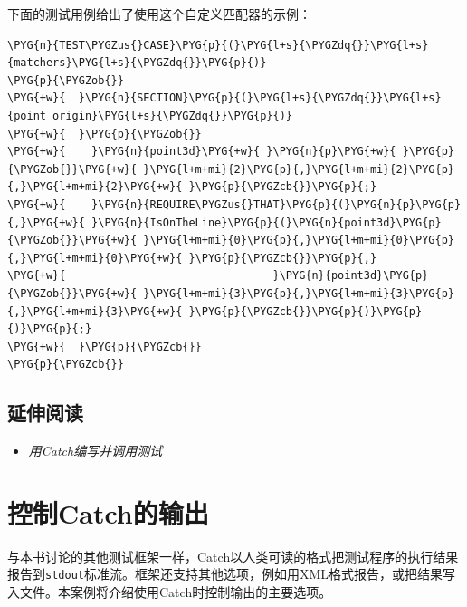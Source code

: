 
下面的测试用例给出了使用这个自定义匹配器的示例：



\begin{codeblockbg}
\begin{Verbatim}[commandchars=\\\{\},breaklines=true,breakanywhere=true,fontsize=\codefont,xleftmargin=17bp]
\PYG{n}{TEST\PYGZus{}CASE}\PYG{p}{(}\PYG{l+s}{\PYGZdq{}}\PYG{l+s}{matchers}\PYG{l+s}{\PYGZdq{}}\PYG{p}{)}
\PYG{p}{\PYGZob{}}
\PYG{+w}{  }\PYG{n}{SECTION}\PYG{p}{(}\PYG{l+s}{\PYGZdq{}}\PYG{l+s}{point origin}\PYG{l+s}{\PYGZdq{}}\PYG{p}{)}
\PYG{+w}{  }\PYG{p}{\PYGZob{}}
\PYG{+w}{    }\PYG{n}{point3d}\PYG{+w}{ }\PYG{n}{p}\PYG{+w}{ }\PYG{p}{\PYGZob{}}\PYG{+w}{ }\PYG{l+m+mi}{2}\PYG{p}{,}\PYG{l+m+mi}{2}\PYG{p}{,}\PYG{l+m+mi}{2}\PYG{+w}{ }\PYG{p}{\PYGZcb{}}\PYG{p}{;}
\PYG{+w}{    }\PYG{n}{REQUIRE\PYGZus{}THAT}\PYG{p}{(}\PYG{n}{p}\PYG{p}{,}\PYG{+w}{ }\PYG{n}{IsOnTheLine}\PYG{p}{(}\PYG{n}{point3d}\PYG{p}{\PYGZob{}}\PYG{+w}{ }\PYG{l+m+mi}{0}\PYG{p}{,}\PYG{l+m+mi}{0}\PYG{p}{,}\PYG{l+m+mi}{0}\PYG{+w}{ }\PYG{p}{\PYGZcb{}}\PYG{p}{,}
\PYG{+w}{                                }\PYG{n}{point3d}\PYG{p}{\PYGZob{}}\PYG{+w}{ }\PYG{l+m+mi}{3}\PYG{p}{,}\PYG{l+m+mi}{3}\PYG{p}{,}\PYG{l+m+mi}{3}\PYG{+w}{ }\PYG{p}{\PYGZcb{}}\PYG{p}{)}\PYG{p}{)}\PYG{p}{;}
\PYG{+w}{  }\PYG{p}{\PYGZcb{}}
\PYG{p}{\PYGZcb{}}
\end{Verbatim}
\end{codeblockbg}



\subsection{延伸阅读}



\begin{itemize}
\item \textit{用Catch编写并调用测试}

\end{itemize}



\section{控制Catch的输出}



与本书讨论的其他测试框架一样，Catch以人类可读的格式把测试程序的执行结果报告到\texttt{stdout}标准流。框架还支持其他选项，例如用XML格式报告，或把结果写入文件。本案例将介绍使用Catch时控制输出的主要选项。


